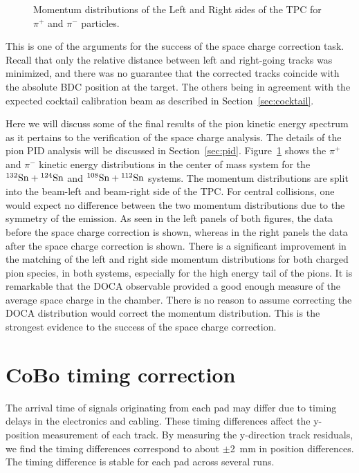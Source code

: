 \begin{figure}[!htb]%
    \centering
    \qquad
	\caption{Momentum distributions of the Left and Right sides of the TPC for $\pi^+$ and $\pi^-$ particles.}
	\label{fig:sc_momdist}
\end{figure}



This is one of the arguments for the success of the space charge correction task. Recall that only the relative distance between left and right-going tracks was minimized, and there was no guarantee that the corrected tracks coincide with the absolute BDC position at the target. The others being in agreement with the expected cocktail calibration beam as described in Section~\ref{sec:cocktail}.

Here we will discuss some of the final results of the pion kinetic energy spectrum as it pertains to the verification of the space charge analysis. The details of the pion PID analysis will be discussed in Section~\ref{sec:pid}. Figure~\ref{fig:sc_momdist} shows the $\pi^+$ and $\pi^-$ kinetic energy distributions in the center of mass system for the ${}^{132}\mathrm{Sn} + {}^{124}\mathrm{Sn}$ and ${}^{108}\mathrm{Sn} + {}^{112}\mathrm{Sn}$ systems. The momentum distributions are split into the beam-left and beam-right side of the TPC. For central collisions, one would expect no difference between the two momentum distributions due to the symmetry of the emission. As seen in the left panels of both figures, the data before the space charge correction is shown, whereas in the right panels the data after the space charge correction is shown. There is a significant improvement in the matching of the left and right side momentum distributions for both charged pion species, in both systems, especially for the high energy tail of the pions. It is remarkable that the DOCA observable provided a good enough measure of the average space charge in the chamber. There is no reason to assume correcting the DOCA distribution would correct the momentum distribution. This is the strongest evidence to the success of the space charge correction.



\section{CoBo timing correction}
The arrival time of signals originating from each pad may differ due to timing delays in the electronics and cabling. These timing differences affect the y-position measurement of each track. By measuring the y-direction track residuals, we find the timing differences correspond to about $\pm$\SI{2}{\milli\metre} in position differences. The timing difference is stable for each pad across several runs. 

